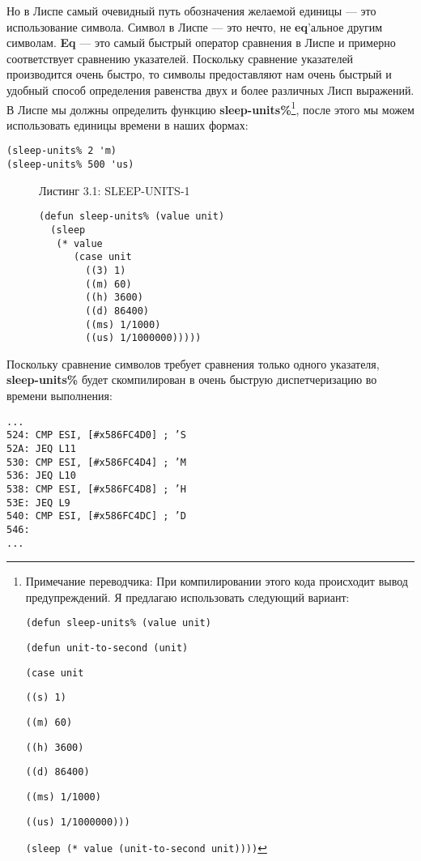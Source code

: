 Но в Лиспе самый очевидный путь обозначения желаемой единицы --- это использование символа. Символ в Лиспе --- это нечто, не \textbf{eq}'альное другим символам. \textbf{Eq} --- это самый быстрый оператор сравнения в Лиспе и примерно соответствует сравнению указателей. Поскольку сравнение указателей производится очень быстро, то символы предоставляют нам очень быстрый и удобный способ определения равенства двух и более различных Лисп выражений. В Лиспе мы должны определить функцию \textbf{sleep-units\%}\footnote{Примечание переводчика: При компилировании этого кода происходит вывод предупреждений. Я предлагаю использовать следующий вариант:

\texttt{(defun sleep-units\% (value unit)}

\texttt{\quad(defun unit-to-second (unit)}

\texttt{\qquad(case unit}

\texttt{\qquad\quad((s) 1)}

\texttt{\qquad\quad((m) 60)}

\texttt{\qquad\quad((h) 3600)}

\texttt{\qquad\quad((d) 86400)}

\texttt{\qquad\quad((ms) 1/1000)}

\texttt{\qquad\quad((us) 1/1000000)))}

\texttt{\quad(sleep (* value (unit-to-second unit))))}

}, после этого мы можем использовать единицы времени в наших формах:

\begin{verbatim}
(sleep-units% 2 'm)
(sleep-units% 500 'us)
\end{verbatim}

\begin{figure}Листинг 3.1: SLEEP-UNITS-1\label{listing_3.1}
\listbegin
\begin{verbatim}
(defun sleep-units% (value unit)
  (sleep
   (* value
      (case unit
        ((3) 1)
        ((m) 60)
        ((h) 3600)
        ((d) 86400)
        ((ms) 1/1000)
        ((us) 1/1000000)))))
\end{verbatim}
\listend
\end{figure}


Поскольку сравнение символов требует сравнения только одного указателя, \textbf{sleep-units\%} будет скомпилирован в очень быструю диспетчеризацию во времени выполнения:

\begin{verbatim}
...
524: CMP ESI, [#x586FC4D0] ; ’S
52A: JEQ L11
530: CMP ESI, [#x586FC4D4] ; ’M
536: JEQ L10
538: CMP ESI, [#x586FC4D8] ; ’H
53E: JEQ L9
540: CMP ESI, [#x586FC4DC] ; ’D
546:
...
\end{verbatim}


